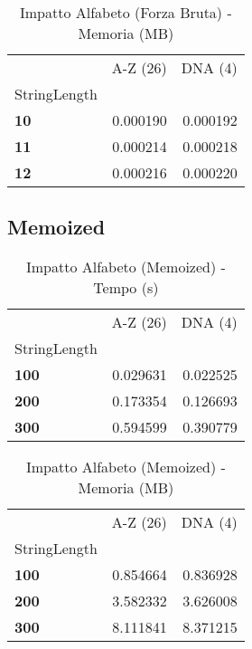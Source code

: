 \documentclass[a4paper, 11pt]{article}
\begin{document}
\begin{center}
\begin{table}[H]
\caption{Impatto Alfabeto (Forza Bruta) - Memoria (MB)}
\label{tab:impatto_alfabeto_memoria_forza_bruta}
\begin{tabular}{l|r|r}
\toprule
 & A-Z (26) & DNA (4) \\
StringLength &  &  \\
\midrule
\textbf{10} & 0.000190 & 0.000192 \\
\textbf{11} & 0.000214 & 0.000218 \\
\textbf{12} & 0.000216 & 0.000220 \\
\bottomrule
\end{tabular}
\end{table}
\end{center}


\subsection{Memoized}
\begin{center}
\begin{table}[H]
\caption{Impatto Alfabeto (Memoized) - Tempo (s)}
\label{tab:impatto_alfabeto_tempo_memoized}
\begin{tabular}{l|r|r}
\toprule
 & A-Z (26) & DNA (4) \\
StringLength &  &  \\
\midrule
\textbf{100} & 0.029631 & 0.022525 \\
\textbf{200} & 0.173354 & 0.126693 \\
\textbf{300} & 0.594599 & 0.390779 \\
\bottomrule
\end{tabular}
\end{table}
\end{center}

\begin{center}
\begin{table}[H]
\caption{Impatto Alfabeto (Memoized) - Memoria (MB)}
\label{tab:impatto_alfabeto_memoria_memoized}
\begin{tabular}{l|r|r}
\toprule
 & A-Z (26) & DNA (4) \\
StringLength &  &  \\
\midrule
\textbf{100} & 0.854664 & 0.836928 \\
\textbf{200} & 3.582332 & 3.626008 \\
\textbf{300} & 8.111841 & 8.371215 \\
\bottomrule
\end{tabular}
\end{table}
\end{center}
\end{document}
